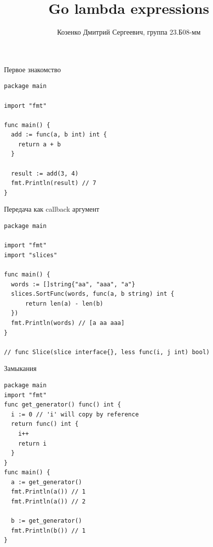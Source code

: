 \documentclass[aspectratio=169]{beamer}
\title[Go lambda expressions]
{Go lambda expressions}
\institute[СПбГУ]{}
\author[Дмитрий Козенко]{Козенко Дмитрий Сергеевич, группа 23.Б08-мм}
\begin{document}

\begin{frame}[fragile]{Первое знакомство}
\begin{verbatim}
package main

import "fmt"

func main() {
  add := func(a, b int) int {
    return a + b
  }

  result := add(3, 4)
  fmt.Println(result) // 7
}
\end{verbatim}
\end{frame}


\begin{frame}[fragile]{Передача как callback аргумент}
\begin{verbatim}
package main

import "fmt"
import "slices"

func main() {
  words := []string{"aa", "aaa", "a"}
  slices.SortFunc(words, func(a, b string) int {
      return len(a) - len(b)
  })
  fmt.Println(words) // [a aa aaa]
}

// func Slice(slice interface{}, less func(i, j int) bool)
\end{verbatim}
\end{frame}


\begin{frame}[fragile]{Замыкания}
\begin{verbatim}
package main
import "fmt"
func get_generator() func() int {
  i := 0 // 'i' will copy by reference
  return func() int {
    i++
    return i
  }
}
func main() {
  a := get_generator()
  fmt.Println(a()) // 1
  fmt.Println(a()) // 2

  b := get_generator()
  fmt.Println(b()) // 1
}
\end{verbatim}
\end{frame}

\end{document}
